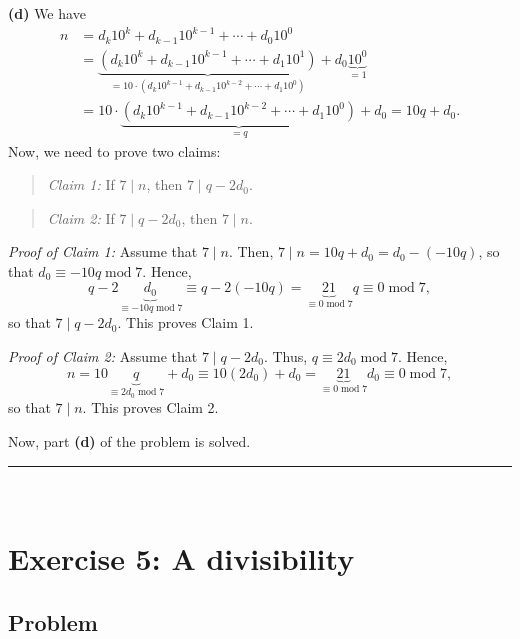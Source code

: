 \documentclass[paper=a4, fontsize=12pt]{scrartcl}%
\theoremstyle{plainsl}
\theoremstyle{definition}
\theoremstyle{remark}
\newenvironment{statement}{\begin{quote}}{\end{quote}}
\begin{document}
\textbf{(d)} We have%
\begin{align*}
n  & =d_{k}10^{k}+d_{k-1}10^{k-1}+\cdots+d_{0}10^{0}\\
& =\underbrace{\left(  d_{k}10^{k}+d_{k-1}10^{k-1}+\cdots+d_{1}10^{1}\right)
}_{=10\cdot\left(  d_{k}10^{k-1}+d_{k-1}10^{k-2}+\cdots+d_{1}10^{0}\right)
}+d_{0}\underbrace{10^{0}}_{=1}\\
& =10\cdot\underbrace{\left(  d_{k}10^{k-1}+d_{k-1}10^{k-2}+\cdots+d_{1}%
10^{0}\right)  }_{=q}+d_{0}=10q+d_{0}.
\end{align*}
Now, we need to prove two claims:

\begin{statement}
\textit{Claim 1:} If $7\mid n$, then $7\mid q-2d_{0}$.
\end{statement}

\begin{statement}
\textit{Claim 2:} If $7\mid q-2d_{0}$, then $7\mid n$.
\end{statement}

\textit{Proof of Claim 1:} Assume that $7\mid n$. Then, $7\mid n=10q+d_{0}%
=d_{0}-\left(  -10q\right)  $, so that $d_{0}\equiv-10q\operatorname{mod}7$.
Hence,%
\[
q-2\underbrace{d_{0}}_{\equiv-10q\operatorname{mod}7}\equiv q-2\left(
-10q\right)  =\underbrace{21}_{\equiv0\operatorname{mod}7}q\equiv
0\operatorname{mod}7,
\]
so that $7\mid q-2d_{0}$. This proves Claim 1.

\textit{Proof of Claim 2:} Assume that $7\mid q-2d_{0}$. Thus, $q\equiv
2d_{0}\operatorname{mod}7$. Hence,%
\[
n=10\underbrace{q}_{\equiv2d_{0}\operatorname{mod}7}+d_{0}\equiv10\left(
2d_{0}\right)  +d_{0}=\underbrace{21}_{\equiv0\operatorname{mod}7}d_{0}%
\equiv0\operatorname{mod}7,
\]
so that $7\mid n$. This proves Claim 2.

Now, part \textbf{(d)} of the problem is solved.

\rule{\linewidth}{0.3pt} \\[0.4cm]

\section{Exercise 5: A divisibility}

\subsection{Problem}
\end{document}
